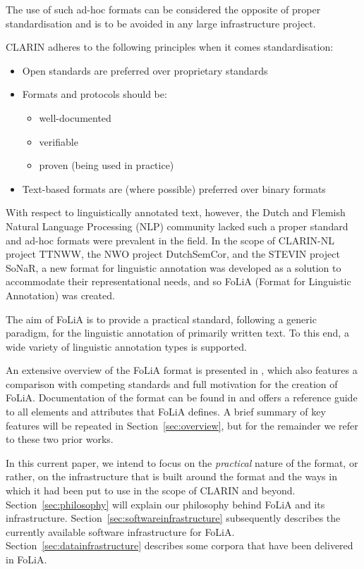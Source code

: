 \documentclass[a4paper,11pt]{article}
\begin{document}
The use of such ad-hoc formats can be considered the opposite of proper
standardisation and is to be avoided in any large infrastructure project. 

CLARIN adheres to the following principles when it comes standardisation:

\begin{itemize}
    \item Open standards are preferred over proprietary standards
    \item Formats and protocols should be:
    \begin{itemize}
        \item well-documented
        \item verifiable
        \item proven (being used in practice)
    \end{itemize}
    \item Text-based formats are (where possible) preferred over binary formats
\end{itemize}

With respect to linguistically annotated text, however, the Dutch and Flemish
Natural Language Processing (NLP) community lacked such a proper standard and ad-hoc formats were prevalent
in the field.  In the scope of CLARIN-NL project TTNWW, the NWO project
DutchSemCor, and the STEVIN project SoNaR, a new format for linguistic
annotation was developed as a solution to accommodate their representational needs, and so
FoLiA (Format for Linguistic Annotation) was created.

The aim of FoLiA is to provide a practical standard, following a generic
paradigm, for the linguistic annotation of primarily written text. To this end,
a wide variety of linguistic annotation types is supported. 

An extensive overview of the FoLiA format is presented in ,
which also features a comparison with competing standards and full motivation
for the creation of FoLiA. Documentation of the format  can be found in
 and offers a reference guide to all elements and attributes
that FoLiA defines.  A brief summary of key features will be repeated in
Section~\ref{sec:overview}, but for the remainder we refer to these two prior
works.

In this current paper, we intend to focus on the \emph{practical} nature of the
format, or rather, on the infrastructure that is built around the format and
the ways in which it had been put to use in the scope of CLARIN and beyond.
Section~\ref{sec:philosophy} will explain our philosophy behind FoLiA and its
infrastructure. Section~\ref{sec:softwareinfrastructure} subsequently describes
the currently available software infrastructure for FoLiA.
Section~\ref{sec:datainfrastructure} describes some corpora that have been
delivered in FoLiA.
\end{document}
